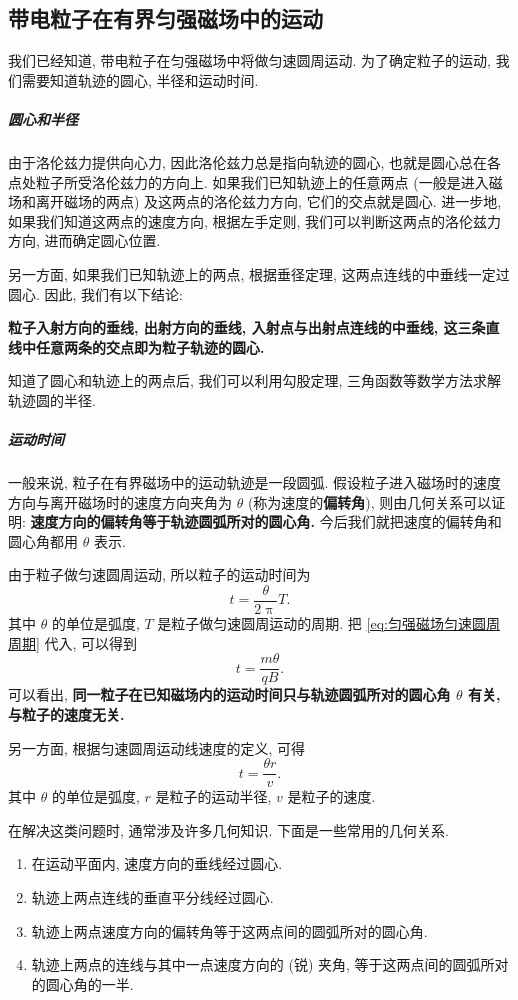 \documentclass[UTF8,openany,fontset=fandol]{ctexbook}
\theoremstyle{chinesetextbook}
\begin{document}
\subsection{带电粒子在有界匀强磁场中的运动}
我们已经知道, 带电粒子在匀强磁场中将做匀速圆周运动. 为了确定粒子的运动, 我们需要知道轨迹的圆心, 半径和运动时间.

\subparagraph{圆心和半径}由于洛伦兹力提供向心力, 因此洛伦兹力总是指向轨迹的圆心, 也就是圆心总在各点处粒子所受洛伦兹力的方向上. 如果我们已知轨迹上的任意两点 (一般是进入磁场和离开磁场的两点) 及这两点的洛伦兹力方向, 它们的交点就是圆心. 进一步地, 如果我们知道这两点的速度方向, 根据左手定则, 我们可以判断这两点的洛伦兹力方向, 进而确定圆心位置.

另一方面, 如果我们已知轨迹上的两点, 根据垂径定理, 这两点连线的中垂线一定过圆心. 因此, 我们有以下结论:

\textbf{粒子入射方向的垂线, 出射方向的垂线, 入射点与出射点连线的中垂线, 这三条直线中任意两条的交点即为粒子轨迹的圆心.}

知道了圆心和轨迹上的两点后, 我们可以利用勾股定理, 三角函数等数学方法求解轨迹圆的半径.

\subparagraph{运动时间} 一般来说, 粒子在有界磁场中的运动轨迹是一段圆弧. 假设粒子进入磁场时的速度方向与离开磁场时的速度方向夹角为 $\theta$ (称为速度的\textbf{偏转角}), 则由几何关系可以证明: \textbf{速度方向的偏转角等于轨迹圆弧所对的圆心角.} 今后我们就把速度的偏转角和圆心角都用 $\theta$ 表示.

由于粒子做匀速圆周运动, 所以粒子的运动时间为
\[
t=\frac{\theta}{2\uppi}T.
\]
其中 $\theta$ 的单位是弧度, $T$ 是粒子做匀速圆周运动的周期. 把 \eqref{eq:匀强磁场匀速圆周周期} 代入, 可以得到
\[
t=\frac{m\theta}{qB}.
\]
可以看出, \textbf{同一粒子在已知磁场内的运动时间只与轨迹圆弧所对的圆心角 $\theta$ 有关, 与粒子的速度无关.}

另一方面, 根据匀速圆周运动线速度的定义, 可得
\[
t=\frac{\theta r}{v}.
\]
其中 $\theta$ 的单位是弧度, $r$ 是粒子的运动半径, $v$ 是粒子的速度.

\bigskip
在解决这类问题时, 通常涉及许多几何知识. 下面是一些常用的几何关系.
\begin{enumerate}
\item 在运动平面内, 速度方向的垂线经过圆心.
\item 轨迹上两点连线的垂直平分线经过圆心.
\item 轨迹上两点速度方向的偏转角等于这两点间的圆弧所对的圆心角.
\item 轨迹上两点的连线与其中一点速度方向的 (锐) 夹角, 等于这两点间的圆弧所对的圆心角的一半.
\end{enumerate}
\end{document}
